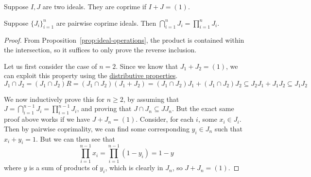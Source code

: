 \begin{definition}
    Suppose \(I,J\) are two ideals.
    They are coprime if \(I+J = (1)\).
\end{definition}
\begin{theorem}\label{thm:coprime-product-intersection}
    Suppose \({\{J_i\}}_{i=1}^n\) are pairwise coprime ideals.
    Then \(\bigcap_{i=1}^n J_i = \prod_{i=1}^n J_i\).
\end{theorem}
\begin{proof}
    From Proposition~\ref{prop:ideal-operations},
    the product is contained within the intersection,
    so it suffices to only prove the reverse inclusion.

    Let us first consider the case of \(n = 2\).
    Since we know that \(J_1+J_2 = (1)\),
    we can exploit this property using the \hyperref[prop:ideal-distributive]{distributive properties}.
    \begin{equation*}
        J_1 \cap J_2 = (J_1 \cap J_2)R = (J_1 \cap J_2)(J_1+J_2)
        = (J_1 \cap J_2)J_1 + (J_1 \cap J_2)J_2
        \subseteq J_2 J_1 + J_1 J_2
        \subseteq J_1 J_2
    \end{equation*}

    We now inductively prove this for \(n \geq 2\),
    by assuming that \(J = \bigcap_{i=1}^{n-1} J_i = \prod_{i=1}^{n-1} J_i\),
    and proving that \(J \cap J_n \subseteq J J_n\).
    But the exact same proof above works if we have \(J+J_n = (1)\).
    Consider, for each \(i\), some \(x_i \in J_i\).
    Then by pairwise coprimality,
    we can find some corresponding \(y_i \in J_n\) such that \(x_i+y_i = 1\).
    But we can then see that
    \begin{equation*}
        \prod_{i=1}^{n-1} x_i = \prod_{i=1}^{n-1} (1-y_i) = 1 - y
    \end{equation*}
    where \(y\) is a sum of products of \(y_i\),
    which is clearly in \(J_n\),
    so \(J+J_n = (1)\).
\end{proof}

